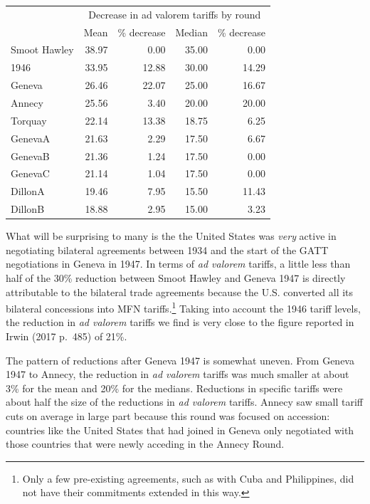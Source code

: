 \documentclass[
  12pt,
]{article}
\begin{document}
\begin{table}[!h]
\centering
\begin{tabular}[t]{lrrrr}
\toprule
\multicolumn{1}{c}{\bgroup\fontsize{12}{14}\selectfont  \egroup{}} & \multicolumn{4}{c}{\bgroup\fontsize{12}{14}\selectfont Decrease in ad valorem tariffs by round\egroup{}} \\
\cmidrule(l{3pt}r{3pt}){2-5}
  & Mean & \% decrease & Median & \% decrease\\
\midrule
Smoot Hawley & 38.97 & 0.00 & 35.00 & 0.00\\
1946 & 33.95 & 12.88 & 30.00 & 14.29\\
Geneva & 26.46 & 22.07 & 25.00 & 16.67\\
Annecy & 25.56 & 3.40 & 20.00 & 20.00\\
Torquay & 22.14 & 13.38 & 18.75 & 6.25\\
\addlinespace
GenevaA & 21.63 & 2.29 & 17.50 & 6.67\\
GenevaB & 21.36 & 1.24 & 17.50 & 0.00\\
GenevaC & 21.14 & 1.04 & 17.50 & 0.00\\
DillonA & 19.46 & 7.95 & 15.50 & 11.43\\
DillonB & 18.88 & 2.95 & 15.00 & 3.23\\
\bottomrule
\end{tabular}
\end{table}

What will be surprising to many is the the United States was \emph{very} active in negotiating bilateral agreements between 1934 and the start of the GATT negotiations in Geneva in 1947. In terms of \emph{ad valorem} tariffs, a little less than half of the 30\% reduction between Smoot Hawley and Geneva 1947 is directly attributable to the bilateral trade agreements because the U.S. converted all its bilateral concessions into MFN tariffs.\footnote{Only a few pre-existing agreements, such as with Cuba and Philippines, did not have their commitments extended in this way.} Taking into account the 1946 tariff levels, the reduction in \emph{ad valorem} tariffs we find is very close to the figure reported in Irwin (2017 p.~485) of 21\%.

The pattern of reductions after Geneva 1947 is somewhat uneven. From Geneva 1947 to Annecy, the reduction in \emph{ad valorem} tariffs was much smaller at about 3\% for the mean and 20\% for the medians. Reductions in specific tariffs were about half the size of the reductions in \emph{ad valorem} tariffs. Annecy saw small tariff cuts on average in large part because this round was focused on accession: countries like the United States that had joined in Geneva only negotiated with those countries that were newly acceding in the Annecy Round.
\end{document}
